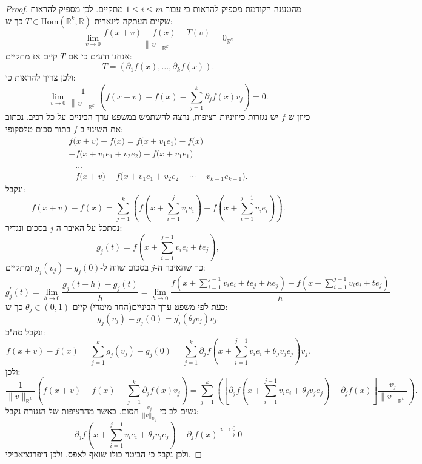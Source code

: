 \documentclass{tstextbook}
\begin{document}
\begin{proof}
מהטענה הקודמת מספיק להראות כי עבור \(1\leq i\leq m\) מתקיים. לכן מספיק להראות שקיים העתקה לינארית \(T\in \mathrm{Hom}\left( \mathbb{R}^k,\mathbb{R} \right)\) כך ש:
$$\operatorname*{lim}_{ v \to0}{\frac{f\left( x+ v  \right)-f(x)-T\left(  v  \right)}{\| v \|_{\mathbb{R}^{k}}}}=0_{\mathbb{R}^k}$$
אנחנו ודעים כי אם \(T\) קיים אז מתקיים:
$$T=\left(\partial_{1}f(x),\ldots,\partial_{k}f(x)\right).$$
ולכן צריך להראות כי:
$$\operatorname*{lim}_{ v \to0}{\frac{1}{\| v \|_{\mathbb{R}^{k}}}}\left(f(x+ v )-f(x)-\sum_{j=1}^{k}\partial_{j}f(x) v _{j}\right)=0.$$
כיוון ש-\(f\) יש נגזרות כיוויניות רציפות, נרצה להשתמש במשפט ערך הביניים על כל רכיב. נכתוב את השינוי ב-\(f\) בתור סכום טלסקופי:
\begin{gather*}{f{\big(}x+ v {\big)}-f{\big(}x{\big)}=f{\big(}x+ v _{1}e_{1}{\big)}-f{\big(}x{\big)}}\\ {+f{\big(}x+ v _{1}e_{1}+ v _{2}e_{2}{\big)}-f{\big(}x+ v _{1}e_{1}{\big)}}\\ {+\ldots}\\ {+f{\big(}x+ v {\big)}-f{\big(}x+ v _{1}e_{1}+ v _{2}e_{2}+\cdots+ v _{k-1}e_{k-1}{\big)}.}\end{gather*}
ונקבל:
$$f(x+ v )-f(x)=\sum_{j=1}^{k}\left(f\left(x+\sum_{i=1}^{j} v _{i}e_{i}\right)-f\left(x+\sum_{i=1}^{j-1} v _{i}e_{i}\right)\right).$$
נסתכל על האיבר ה-\(j\) בסכום ונגדיר:
$$g_{j}(t)=f\left(x+\sum_{i=1}^{j-1} v _{i}e_{i}+t e_{j}\right),$$
כך שהאיבר ה-\(j\) בסכום שווה ל-\(g_{j}(v_{j})-g_{j}(0)\) ומתקיים:
$$g_{j}^{\prime}(t)=\operatorname*{lim}_{h\to0}{\frac{g_{j}(t+h)-g_{j}(t)}{h}}=\operatorname*{lim}_{h\to0}{\frac{f\left(x+\sum_{i=1}^{j-1} v _{i}e_{i}+t e_{j}+h e_{j}\right)-f\left(x+\sum_{i=1}^{j-1} v _{i}e_{i}+t e_{j}\right)}{h}}$$
כעת לפי משפט ערך הביניים(החד מימדי) קיים \(\theta_{j}\in(0,1)\) כך ש:
$$g_{j}( v _{j})-g_{j}(0)=g_{j}^{\prime}(\theta_{j} v _{j}) v _{j}.$$
ונקבל סה"כ:
$$f(x+ v )-f(x)=\sum_{j=1}^{k}g_{j}( v _{j})-g_{j}(0)=\sum_{j=1}^{k}\partial_{j}f\left(x+\sum_{i=1}^{j-1} v _{i}e_{i}+\theta_{j} v _{j}e_{j}\right) v _{j}.$$
ולכן:
$${\frac{1}{\|v\|_{\mathbb{R}^{k}}}}\left(f(x+ v )-f(x)-\sum_{j=1}^{k}\partial_{j}f(x) v _{j}\right)=\sum_{j=1}^{k}\left(\left[\partial_{j}f\left(x+\sum_{i=1}^{j-1} v _{i}e_{i}+\theta_{j} v _{j}e_{j}\right)-\partial_{j}f(x)\right]{\frac{ v _{j}}{\|v\|_{\mathbb{R}^{k}}}}\right).$$
נשים לב כי \(\frac{v_{j}}{||v||_{\mathbb{R}_{k}}}\) חסום. כאשר מהרציפות של הנגזרת נקבל:
$$\partial_{j}f\left(x+\sum_{i=1}^{j-1} v _{i}e_{i}+\theta_{j} v _{j}e_{j}\right)-\partial_{j}f(x)\xrightarrow{v\to 0} 0$$
ולכן נקבל כי הביטוי כולו שואף לאפס, ולכן דיפרנציאבילי.

\end{proof}
\end{document}
